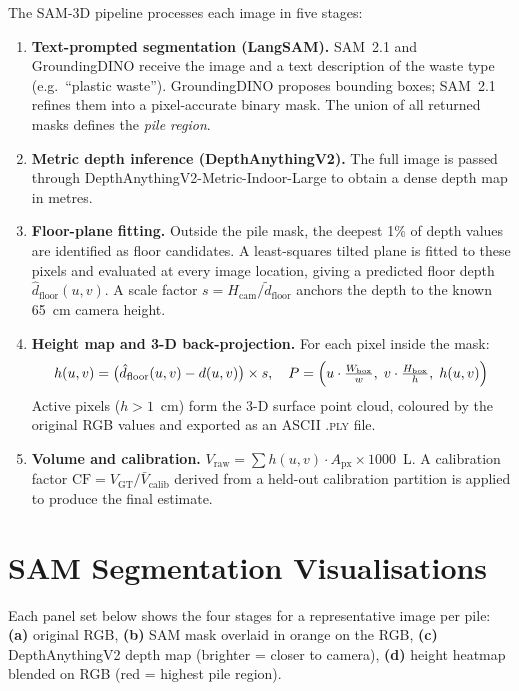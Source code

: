 \documentclass[11pt,a4paper]{article}
\begin{document}
\noindent
The SAM-3D pipeline processes each image in five stages:

\begin{enumerate}
  \item \textbf{Text-prompted segmentation (LangSAM).}
  SAM~2.1 and GroundingDINO receive the image and a text description of the
  waste type (e.g.\ ``plastic waste'').  GroundingDINO proposes bounding boxes;
  SAM~2.1 refines them into a pixel-accurate binary mask.  The union of all
  returned masks defines the \emph{pile region}.

  \item \textbf{Metric depth inference (DepthAnythingV2).}
  The full image is passed through DepthAnythingV2-Metric-Indoor-Large to
  obtain a dense depth map in metres.

  \item \textbf{Floor-plane fitting.}
  Outside the pile mask, the deepest 1\% of depth values are identified as
  floor candidates.  A least-squares tilted plane is fitted to these pixels
  and evaluated at every image location, giving a predicted floor depth
  $\hat{d}_\text{floor}(u,v)$.  A scale factor
  $s = H_\text{cam}/\tilde{d}_\text{floor}$ anchors the depth to the known
  65~cm camera height.

  \item \textbf{Height map and 3-D back-projection.}
  For each pixel inside the mask:
  \[
    h(u,v) = \bigl(\hat{d}_\text{floor}(u,v)-d(u,v)\bigr)\times s,
    \quad
    P = \Bigl(u\cdot\tfrac{W_\text{box}}{w},\;v\cdot\tfrac{H_\text{box}}{h},\;
    h(u,v)\Bigr)
  \]
  Active pixels ($h > 1$~cm) form the 3-D surface point cloud,
  coloured by the original RGB values and exported as an ASCII
  \textsc{.ply} file.

  \item \textbf{Volume and calibration.}
  $V_\text{raw} = \sum h(u,v)\cdot A_\text{px}\times 1000$~L.
  A calibration factor $\text{CF} = V_\text{GT}/\bar{V}_\text{calib}$
  derived from a held-out calibration partition is applied to produce
  the final estimate.
\end{enumerate}

\section{SAM Segmentation Visualisations}

Each panel set below shows the four stages for a representative image per pile:
\textbf{(a)} original RGB, \textbf{(b)} SAM mask overlaid in orange on the RGB,
\textbf{(c)} DepthAnythingV2 depth map (brighter = closer to camera),
\textbf{(d)} height heatmap blended on RGB (red = highest pile region).
\end{document}

